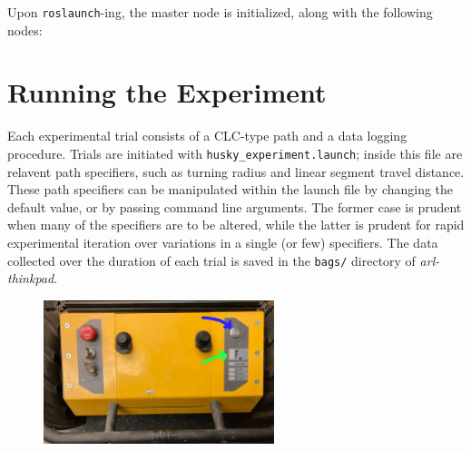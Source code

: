 \documentclass[
	12pt, %
]{fphw}
\newcommand{\code}[1]{\colorbox{light-gray}{\texttt{#1}}}
\begin{document}
Upon \code{roslaunch}-ing, the master node is initialized, along with the following nodes:



\section{Running the Experiment}

Each experimental trial consists of a CLC-type path and a data logging procedure. Trials are initiated with \code{husky\_experiment.launch}; inside this file are relavent path specifiers, such as turning radius and linear segment travel distance. These path specifiers can be manipulated within the launch file by changing the default value, or by passing command line arguments. The former case is prudent when many of the specifiers are to be altered, while the latter is prudent for rapid experimental iteration over variations in a single (or few) specifiers. The data collected over the duration of each trial is saved in the \code{bags/} directory of \emph{arl-thinkpad}.

\begin{figure}
  \centering
  \includegraphics[width=0.6\textwidth]{figs/HuskyPanel.jpg}
\end{figure}
\end{document}
